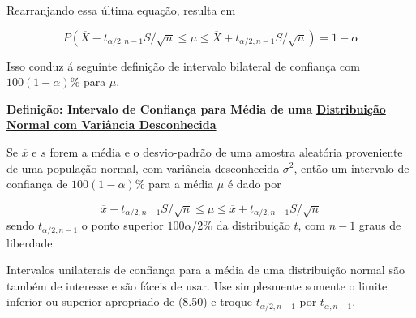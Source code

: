 \documentclass[a4paper,12pt]{article} %
\begin{document}
	Rearranjando essa última equação, resulta em
	
	\begin{equation*}
		\tag{8.49}
		P\left(\overline{X} -t_{\alpha / 2, n-1}S/ \sqrt{n} \leq  \mu \leq \overline{X} + t_{\alpha / 2, n-1}S/ \sqrt{n} \right) = 1- \alpha
	\end{equation*}

	Isso conduz á seguinte definição de intervalo bilateral de confiança com  $100 \left(1- \alpha \right)  \%$ para $ \mu $.
	
	\begin{blockquote}
		\begin{center}
			\textbf{Definição: Intervalo de Confiança para Média de uma} \textbf{\underline{Distribuição Normal com Variância Desconhecida}}  
		\end{center}
		
		Se $\overline{x}$ e $s$ forem a média e o desvio-padrão de uma amostra aleatória proveniente de uma população normal, com variância desconhecida $\sigma^2$, então um intervalo de confiança de $100 \left(1- \alpha \right)  \%$ para a média $\mu$ é dado por
		
		\begin{equation*}
			\tag{8.50}
			\overline{x} -t_{\alpha / 2, n-1}S/ \sqrt{n} \leq  \mu \leq \overline{x} + t_{\alpha / 2, n-1}S/ \sqrt{n}
		\end{equation*}
		sendo $ t_{\alpha / 2, n-1} $ o ponto superior $100 \alpha / 2 \%$ da distribuição $t$, com $n-1$ graus de liberdade.
	\end{blockquote}

	Intervalos unilaterais de confiança para a média de uma distribuição normal são também de interesse e são fáceis de usar. Use simplesmente somente o limite inferior ou superior apropriado de (8.50) e troque $ t_{\alpha / 2, n-1} $ por $ t_{\alpha, n-1} $.
	
	
\end{document}
